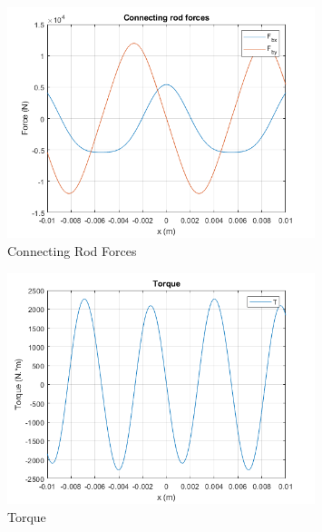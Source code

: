 \documentclass[12pt, titlepage]{article}
\begin{document}
\begin{figure}[H]
    \centering
    \includegraphics[width=0.8\textwidth]{./Images/10.png}
    \caption{Connecting Rod Forces}
    \label{fig:connectingrodforces}
\end{figure}
\begin{figure}[H]
    \centering
    \includegraphics[width=0.8\textwidth]{./Images/11.png}
    \caption{Torque}
    \label{fig:torque}
\end{figure}
\end{document}
